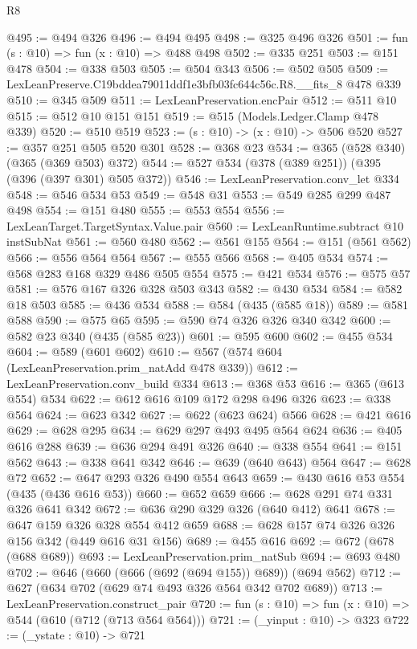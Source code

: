 \begin{lexlean}{R8}
\begin{coremodule}
@495 := @494 @326
@496 := @494 @495
@498 := @325 @496 @326
@501 := fun (s : @10) => fun (x : @10) => @488 @498
@502 := @335 @251
@503 := @151 @478
@504 := @338 @503
@505 := @504 @343
@506 := @502 @505
@509 := LexLeanPreserve.C19bddea79011ddf1e3bfb03fc644c56c.R8.__fits_8 @478 @339
@510 := @345 @509
@511 := LexLeanPreservation.encPair
@512 := @511 @10
@515 := @512 @10 @151 @151
@519 := @515 (Models.Ledger.Clamp @478 @339)
@520 := @510 @519
@523 := (s : @10) -> (x : @10) -> @506 @520
@527 := @357 @251 @505 @520 @301
@528 := @368 @23
@534 := @365 (@528 @340) (@365 (@369 @503) @372)
@544 := @527 @534 (@378 (@389 @251)) (@395 (@396 (@397 @301) @505 @372))
@546 := LexLeanPreservation.conv_let @334
@548 := @546 @534 @53
@549 := @548 @31
@553 := @549 @285 @299 @487 @498
@554 := @151 @480
@555 := @553 @554
@556 := LexLeanTarget.TargetSyntax.Value.pair
@560 := LexLeanRuntime.subtract @10 instSubNat
@561 := @560 @480
@562 := @561 @155
@564 := @151 (@561 @562)
@566 := @556 @564 @564
@567 := @555 @566
@568 := @405 @534
@574 := @568 @283 @168 @329 @486 @505 @554
@575 := @421 @534
@576 := @575 @57
@581 := @576 @167 @326 @328 @503 @343
@582 := @430 @534
@584 := @582 @18 @503
@585 := @436 @534
@588 := @584 (@435 (@585 @18))
@589 := @581 @588
@590 := @575 @65
@595 := @590 @74 @326 @326 @340 @342
@600 := @582 @23 @340 (@435 (@585 @23))
@601 := @595 @600
@602 := @455 @534
@604 := @589 (@601 @602)
@610 := @567 (@574 @604 (LexLeanPreservation.prim_natAdd @478 @339))
@612 := LexLeanPreservation.conv_build @334
@613 := @368 @53
@616 := @365 (@613 @554) @534
@622 := @612 @616 @109 @172 @298 @496 @326
@623 := @338 @564
@624 := @623 @342
@627 := @622 (@623 @624) @566
@628 := @421 @616
@629 := @628 @295
@634 := @629 @297 @493 @495 @564 @624
@636 := @405 @616 @288
@639 := @636 @294 @491 @326
@640 := @338 @554
@641 := @151 @562
@643 := @338 @641 @342
@646 := @639 (@640 @643) @564
@647 := @628 @72
@652 := @647 @293 @326 @490 @554 @643
@659 := @430 @616 @53 @554 (@435 (@436 @616 @53))
@660 := @652 @659
@666 := @628 @291 @74 @331 @326 @641 @342
@672 := @636 @290 @329 @326 (@640 @412) @641
@678 := @647 @159 @326 @328 @554 @412 @659
@688 := @628 @157 @74 @326 @326 @156 @342 (@449 @616 @31 @156)
@689 := @455 @616
@692 := @672 (@678 (@688 @689))
@693 := LexLeanPreservation.prim_natSub
@694 := @693 @480
@702 := @646 (@660 (@666 (@692 (@694 @155)) @689)) (@694 @562)
@712 := @627 (@634 @702 (@629 @74 @493 @326 @564 @342 @702 @689))
@713 := LexLeanPreservation.construct_pair
@720 := fun (s : @10) => fun (x : @10) => @544 (@610 (@712 (@713 @564 @564)))
@721 := (_yinput : @10) -> @323
@722 := (_ystate : @10) -> @721

\end{coremodule}
\end{lexlean}
